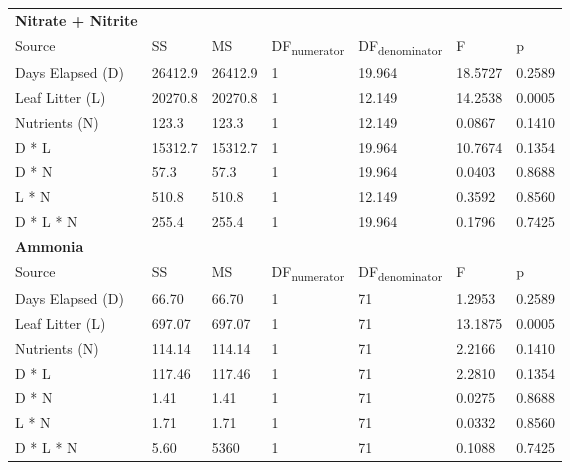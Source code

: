 \begin{table}
\label{tab:nut_anova}
\begin{tabular}{ l l l l l l l }
\textbf{Nitrate + Nitrite} & & & & & &\\
Source           & SS       & MS       & DF\textsubscript{numerator} & DF\textsubscript{denominator} & F       & p  \\
Days Elapsed (D) & 26412.9  & 26412.9  & 1                           & 19.964                        & 18.5727 & 0.2589 \\
Leaf Litter (L)  & 20270.8  & 20270.8  & 1                           & 12.149                        & 14.2538 & 0.0005 \\
Nutrients (N)    & 123.3    & 123.3    & 1                           & 12.149                        & 0.0867  & 0.1410 \\
D * L            & 15312.7  & 15312.7  & 1                           & 19.964                        & 10.7674 & 0.1354 \\
D * N            & 57.3     & 57.3     & 1                           & 19.964                        & 0.0403  & 0.8688 \\
L * N            & 510.8    & 510.8    & 1                           & 12.149                        & 0.3592  & 0.8560 \\
D * L * N        & 255.4    & 255.4    & 1                           & 19.964                        & 0.1796  & 0.7425 \\

\textbf{Ammonia} & & & & & &\\
Source           & SS      & MS     & DF\textsubscript{numerator} & DF\textsubscript{denominator} & F       & p  \\
Days Elapsed (D) & 66.70   & 66.70  & 1                           & 71                            & 1.2953  & 0.2589 \\
Leaf Litter (L)  & 697.07  & 697.07 & 1                           & 71                            & 13.1875 & 0.0005 \\
Nutrients (N)    & 114.14  & 114.14 & 1                           & 71                            & 2.2166  & 0.1410 \\
D * L            & 117.46  & 117.46 & 1                           & 71                            & 2.2810  & 0.1354 \\
D * N            & 1.41    & 1.41   & 1                           & 71                            & 0.0275  & 0.8688 \\
L * N            & 1.71    & 1.71   & 1                           & 71                            & 0.0332  & 0.8560 \\
D * L * N        & 5.60    & 5360   & 1                           & 71                            & 0.1088  & 0.7425 \\


\end{tabular}
\end{table}
